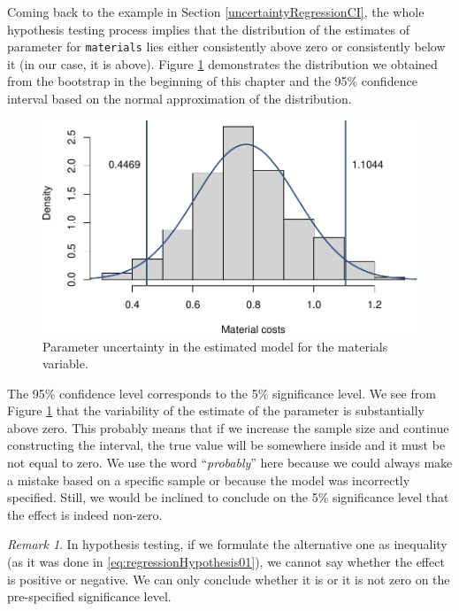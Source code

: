 \documentclass[
]{book}
\theoremstyle{definition}
\theoremstyle{definition}
\theoremstyle{definition}
\theoremstyle{definition}
\theoremstyle{remark}
\newtheorem*{remark}{Remark}
\begin{document}
Coming back to the example in Section \ref{uncertaintyRegressionCI}, the whole hypothesis testing process implies that the distribution of the estimates of parameter for \texttt{materials} lies either consistently above zero or consistently below it (in our case, it is above). Figure \ref{fig:costsModelMLRCImaterials} demonstrates the distribution we obtained from the bootstrap in the beginning of this chapter and the 95\% confidence interval based on the normal approximation of the distribution.

\begin{figure}
\centering
\includegraphics{Svetunkov---Statistics-for-Business-Analytics_files/figure-latex/costsModelMLRCImaterials-1.pdf}
\caption{\label{fig:costsModelMLRCImaterials}Parameter uncertainty in the estimated model for the materials variable.}
\end{figure}

The 95\% confidence level corresponds to the 5\% significance level. We see from Figure \ref{fig:costsModelMLRCImaterials} that the variability of the estimate of the parameter is substantially above zero. This probably means that if we increase the sample size and continue constructing the interval, the true value will be somewhere inside and it must be not equal to zero. We use the word ``\emph{probably}'' here because we could always make a mistake based on a specific sample or because the model was incorrectly specified. Still, we would be inclined to conclude on the 5\% significance level that the effect is indeed non-zero.

\begin{remark}
In hypothesis testing, if we formulate the alternative one as inequality (as it was done in \eqref{eq:regressionHypothesis01}), we cannot say whether the effect is positive or negative. We can only conclude whether it is or it is not zero on the pre-specified significance level.
\end{remark}
\end{document}
